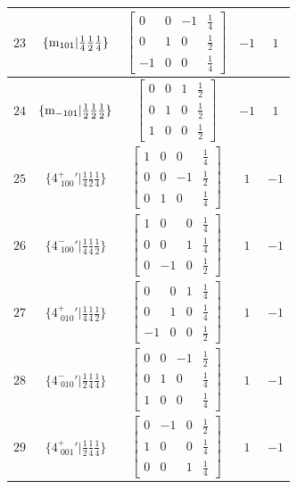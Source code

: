 \documentclass[fleqn,8pt]{jsarticle}
\begin{document}
\begin{longtable}{ccccc}
$ 23 $ & $ \{{\rm m}_{101}|\frac{1}{4} \frac{1}{2} \frac{1}{4}\} $ & $ \begin{bmatrix} 0 & 0 & -1 & \frac{1}{4} \\ 0 & 1 & 0 & \frac{1}{2} \\ -1 & 0 & 0 & \frac{1}{4} \end{bmatrix} $ & $ -1 $ & $ 1 $ \\ \hline
$ 24 $ & $ \{{\rm m}_{-101}|\frac{1}{2} \frac{1}{2} \frac{1}{2}\} $ & $ \begin{bmatrix} 0 & 0 & 1 & \frac{1}{2} \\ 0 & 1 & 0 & \frac{1}{2} \\ 1 & 0 & 0 & \frac{1}{2} \end{bmatrix} $ & $ -1 $ & $ 1 $ \\ \hline
$ 25 $ & $ \{4^{+}_{\,\,100}{}'|\frac{1}{4} \frac{1}{2} \frac{1}{4}\} $ & $ \begin{bmatrix} 1 & 0 & 0 & \frac{1}{4} \\ 0 & 0 & -1 & \frac{1}{2} \\ 0 & 1 & 0 & \frac{1}{4} \end{bmatrix} $ & $ 1 $ & $ -1 $ \\ \hline
$ 26 $ & $ \{4^{-}_{\,\,100}{}'|\frac{1}{4} \frac{1}{4} \frac{1}{2}\} $ & $ \begin{bmatrix} 1 & 0 & 0 & \frac{1}{4} \\ 0 & 0 & 1 & \frac{1}{4} \\ 0 & -1 & 0 & \frac{1}{2} \end{bmatrix} $ & $ 1 $ & $ -1 $ \\ \hline
$ 27 $ & $ \{4^{+}_{\,\,010}{}'|\frac{1}{4} \frac{1}{4} \frac{1}{2}\} $ & $ \begin{bmatrix} 0 & 0 & 1 & \frac{1}{4} \\ 0 & 1 & 0 & \frac{1}{4} \\ -1 & 0 & 0 & \frac{1}{2} \end{bmatrix} $ & $ 1 $ & $ -1 $ \\ \hline
$ 28 $ & $ \{4^{-}_{\,\,010}{}'|\frac{1}{2} \frac{1}{4} \frac{1}{4}\} $ & $ \begin{bmatrix} 0 & 0 & -1 & \frac{1}{2} \\ 0 & 1 & 0 & \frac{1}{4} \\ 1 & 0 & 0 & \frac{1}{4} \end{bmatrix} $ & $ 1 $ & $ -1 $ \\ \hline
$ 29 $ & $ \{4^{+}_{\,\,001}{}'|\frac{1}{2} \frac{1}{4} \frac{1}{4}\} $ & $ \begin{bmatrix} 0 & -1 & 0 & \frac{1}{2} \\ 1 & 0 & 0 & \frac{1}{4} \\ 0 & 0 & 1 & \frac{1}{4} \end{bmatrix} $ & $ 1 $ & $ -1 $ \\ \hline

\end{longtable}
\end{document}
